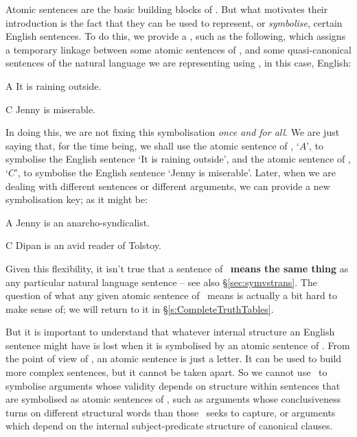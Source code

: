 Atomic sentences are the basic building blocks of \TFL. But what motivates their introduction is the fact that they can be used to represent, or \emph{symbolise}, certain English sentences. To do this, we provide a , such as the following, which assigns a temporary linkage between some atomic sentences of \TFL, and some quasi-canonical sentences of the natural language we are representing using \TFL, in this case, English:
	\begin{ekey}
		\item[A] It is raining outside.
		\item[C] Jenny is miserable.
	\end{ekey}
In doing this, we are not fixing this symbolisation \emph{once and for all}. We are just saying that, for the time being, we shall use the atomic sentence of \TFL, `$A$', to symbolise the English sentence `It is raining outside', and the atomic sentence of \TFL, `$C$', to symbolise the English sentence `Jenny is miserable'. Later, when we are dealing with different sentences or different arguments, we can provide a new symbolisation key; as it might be:
	\begin{ekey}
		\item[A] Jenny is an anarcho-syndicalist.
		\item[C] Dipan is an avid reader of Tolstoy.
	\end{ekey}
Given this flexibility, it isn't true that a sentence of \TFL\ \textbf{means the same thing} as any particular natural language sentence – see also §\ref{sec:symvstrans}. The question of what any given atomic sentence of \TFL\ means is actually a bit hard to make sense of; we will return to it in §\ref{s:CompleteTruthTables}.


But it is important to understand that whatever internal structure an English sentence might have is lost when it is symbolised by an atomic sentence of \TFL. From the point of view of \TFL, an atomic sentence is just a letter. It can be used to build more complex sentences, but it cannot be taken apart. So we cannot use \TFL\ to symbolise arguments whose validity depends on structure within sentences that are symbolised as atomic sentences of \TFL, such as arguments whose conclusiveness turns on different structural words than those \TFL\ seeks to capture, or arguments which depend on the internal subject-predicate structure of canonical clauses.





